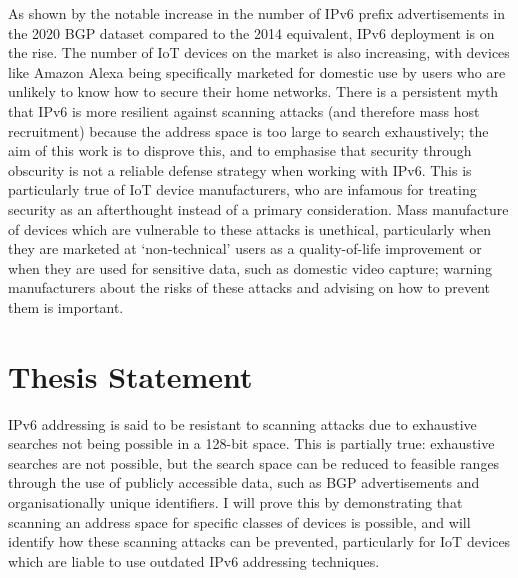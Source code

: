 \documentclass[10pt,sigconf]{acmart}
\begin{document}
As shown by the notable increase in the number of IPv6 prefix advertisements in the 2020 BGP dataset compared to the 2014 equivalent, IPv6 deployment is on the rise.
The number of IoT devices on the market is also increasing, with devices like Amazon Alexa being specifically marketed for domestic use by users who are unlikely to know how to secure their home networks.
There is a persistent myth that IPv6 is more resilient against scanning attacks (and therefore mass host recruitment) because the address space is too large to search exhaustively;
the aim of this work is to disprove this, and to emphasise that security through obscurity is not a reliable defense strategy when working with IPv6.
This is particularly true of IoT device manufacturers, who are infamous for treating security as an afterthought instead of a primary consideration.
Mass manufacture of devices which are vulnerable to these attacks is unethical, particularly when they are marketed at `non-technical' users as a quality-of-life improvement or when they are used for sensitive data, such as domestic video capture;
warning manufacturers about the risks of these attacks and advising on how to prevent them is important.

\section{Thesis Statement}

IPv6 addressing is said to be resistant to scanning attacks due to exhaustive searches not being possible in a 128-bit space.
This is partially true:
exhaustive searches are not possible, but the search space can be reduced to feasible ranges through the use of publicly accessible data, such as BGP advertisements and organisationally unique identifiers.
I will prove this by demonstrating that scanning an address space for specific classes of devices is possible, and will identify how these scanning attacks can be prevented, particularly for IoT devices which are liable to use outdated IPv6 addressing techniques.

%
\end{document}

